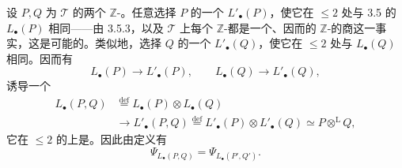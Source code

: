 设 $P,Q$ 为 $\mathcal T$ 的两个 $\mathbb Z$-。任意选择 $P$ 的一个 $L'_\bullet(P)$，使它在 $\leq2$ 处与 3.5 的 $L_\bullet(P)$ 相同——由 3.5.3，以及 $\mathcal T$ 上每个 $\mathbb Z$-都是一个、因而的 $\mathbb Z$-的商这一事实，这是可能的。类似地，选择 $Q$ 的一个 $L'_\bullet(Q)$，使它在 $\leq2$ 处与 $L_\bullet(Q)$ 相同。因而有
\[
L_\bullet(P)\longrightarrow L'_\bullet(P),\qquad
L_\bullet(Q)\longrightarrow L'_\bullet(Q),\tag{3.6.1}
\]
诱导一个
\[
\begin{aligned}
L_\bullet(P,Q)&\overset{\mathrm{def}}=L_\bullet(P)\otimes L_\bullet(Q)\\
&\longrightarrow L'_\bullet(P,Q)\overset{\mathrm{def}}=L'_\bullet(P)\otimes L'_\bullet(Q)
\simeq P\mathbin{\otimes^{\mathrm L}}Q,
\end{aligned}\tag{3.6.2}
\]
它在 $\leq2$ 的上是。因此由定义有
\[
\Psi_{L_\bullet(P,Q)}=\Psi_{L_\bullet(P',Q')}.\tag{3.6.3}
\]

